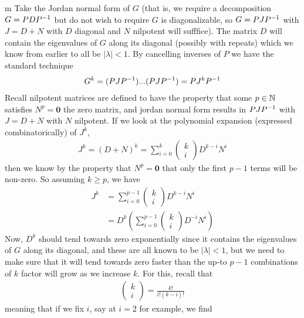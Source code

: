 \documentclass[11pt]{article}
\begin{document}
\begin{my proof}{m}
Take the Jordan normal form of $G$ (that is, we require a decomposition $G = PDP^{-1} $ but do not wish to require $G$ is diagonalizable, so $G = P J P^{-1}$ with $J = D + N$ with $D$ diagonal and $N$ nilpotent will sufffice). The matrix $D$ will contain the eigenvalues of $G$ along its diagonal (possibly with repeats) which we know from earlier to all be $|\lambda| < 1$. By cancelling inverses of $P$ we have the standard technique \begin{gather*}
G^k = (PJP^{-1}) ... (PJP^{-1}) = PJ^k P^{-1}
\end{gather*}
Recall nilpotent matrices are defined to have the property that some $p \in \mathbb{N}$ satisfies $N^p = \mathbf{0}$ the zero matrix, and jordan normal form results in $PJP^{-1}$ with $J = D + N$ with $N$ nilpotent. If we look at the polynomial expansion (expressed combinatorically) of $J^k$, \begin{gather*}
J^k = (D + N)^k = \sum_{i=0}^k \left( \begin{matrix} k \\ i\end{matrix} \right) D^{k - i} N^i
\end{gather*}
then we know by the property that $N^p = \mathbf{0}$ that only the first $p-1$ terms will be non-zero. So assuming $k \ge p$, we have 
\begin{align*}
J^k &= \sum_{i=0}^{p-1} \left( \begin{matrix} k \\ i\end{matrix} \right) D^{k - i} N^i \\
&= D^k \left( \sum_{i=0}^{p-1} \left( \begin{matrix} k \\ i\end{matrix} \right) D^{- i} N^i \right)
\end{align*}
Now, $D^k$ should tend towards zero exponentially since it contains the eigenvalues of $G$ along its diagonal, and these are all known to be $|\lambda| < 1$, but we need to make sure that it will tend towards zero faster than the up-to $p-1$ combinations of $k$ factor will grow as we increase $k$. For this, recall that \begin{gather*}
\left( \begin{matrix} k \\ i\end{matrix} \right) = \frac{k!}{i! (k-i)!}
\end{gather*}
meaning that if we fix $i$, say at $i=2$ for example, we find \begin{gather*}

\end{gather*}
\end{my proof}
\end{document}
